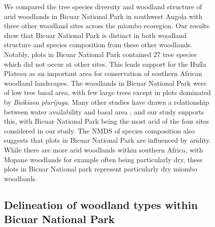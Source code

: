 \documentclass[diversity,article,submit,moreauthors,pdftex]{Definitions/mdpi}
\begin{document}
\begin{figure}[H]
We compared the tree species diversity and woodland structure of arid woodlands in Bicuar National Park in southwest Angola with three other woodland sites across the miombo ecoregion. Our results show that Bicuar National Park is distinct in both woodland structure and species composition from these other woodlands. Notably, plots in Bicuar National Park contained 27 tree species which did not occur at other sites. This lends support for the Hu\'{i}la Plateau as an important area for conservation of southern African woodland landscapes. The woodlands in Bicuar National Park were of low tree basal area, with few large trees except in plots dominated by \textit{Baikiaea plurijuga}. Many other studies have drawn a relationship between water availability and basal area \citep{Terra2018, Strickland2016}, and our study supports this, with Bicuar National Park being the most arid of the four sites considered in our study. The NMDS of species composition also suggests that plots in Bicuar National Park are influenced by aridity. While there are more arid woodlands within southern Africa, with Mopane woodlands for example often being particularly dry, these plots in Bicuar National park represent particularly dry miombo woodlands.

\subsection{Delineation of woodland types within Bicuar National Park}


\end{figure}
\end{document}
